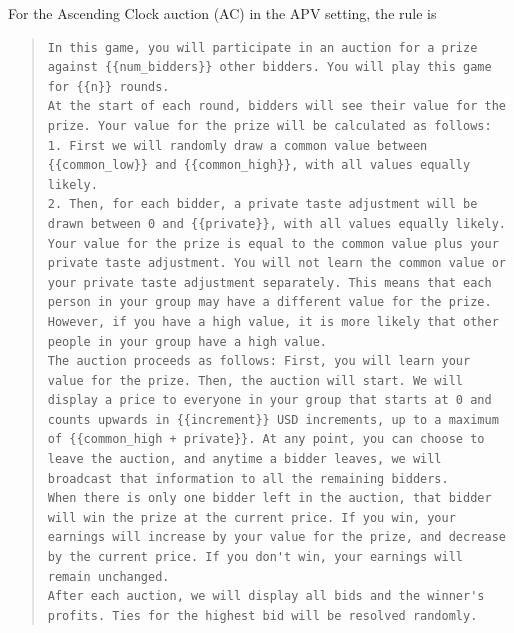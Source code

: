 \documentclass{article} %
\begin{document}
For the Ascending Clock auction (AC) in the APV setting, the rule is
\begin{quote}
\begin{lstlisting}[basicstyle=\ttfamily, breaklines=true]
In this game, you will participate in an auction for a prize against {{num_bidders}} other bidders. You will play this game for {{n}} rounds. 
At the start of each round, bidders will see their value for the prize. Your value for the prize will be calculated as follows:
1. First we will randomly draw a common value between {{common_low}} and {{common_high}}, with all values equally likely.
2. Then, for each bidder, a private taste adjustment will be drawn between 0 and {{private}}, with all values equally likely.
Your value for the prize is equal to the common value plus your private taste adjustment. You will not learn the common value or your private taste adjustment separately. This means that each person in your group may have a different value for the prize. However, if you have a high value, it is more likely that other people in your group have a high value.
The auction proceeds as follows: First, you will learn your value for the prize. Then, the auction will start. We will display a price to everyone in your group that starts at 0 and counts upwards in {{increment}} USD increments, up to a maximum of {{common_high + private}}. At any point, you can choose to leave the auction, and anytime a bidder leaves, we will broadcast that information to all the remaining bidders. 
When there is only one bidder left in the auction, that bidder will win the prize at the current price. If you win, your earnings will increase by your value for the prize, and decrease by the current price. If you don't win, your earnings will remain unchanged.
After each auction, we will display all bids and the winner's profits. Ties for the highest bid will be resolved randomly.\end{lstlisting}
\end{quote}
\end{document}
